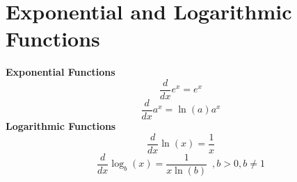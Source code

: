 \section{Exponential and Logarithmic Functions}
\label{sec:explogderiv}

\begin{theorem}
{\bf Exponential Functions}
$$\dfrac{d}{dx}e^x=e^x$$
$$\dfrac{d}{dx}a^x=\ln(a)a^x$$
{\bf Logarithmic Functions}
$$\dfrac{d}{dx}\ln(x)=\dfrac{1}{x}$$
$$\dfrac{d}{dx}\log_b(x)=\dfrac{1}{x\ln(b)}\enspace , b>0, b\neq 1 $$
\end{theorem}
